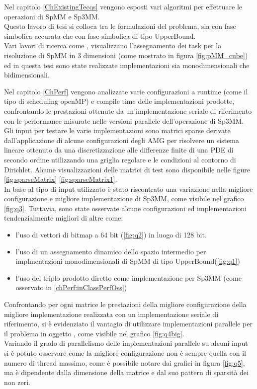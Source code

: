 Nel capitolo \ref{ChExistingTecqs} vengono esposti vari algoritmi per effettuare le operazioni di SpMM e Sp3MM.\\
Questo lavoro di tesi si colloca tra le formulazioni \rowbyrow del problema, 
sia con fase simbolica accurata che con fase simbolica di tipo UpperBound.\\
Vari lavori di ricerca come \cite{cartesianPartitioningModels}, visualizzano 
l'assegnamento dei task per la risoluzione di SpMM in 3 dimensioni (come mostrato in figura \ref{fig:pMM_cube})
ed in questa tesi sono state realizzate implementazioni sia monodimensionali che bidimensionali.

Nel capitolo \ref{ChPerf} vengono analizzate varie configurazioni a runtime (come il tipo di scheduling openMP) 
e compile time delle implementazioni prodotte,
confrontando le prestazioni ottenute da un'implementazione seriale di riferimento 
con le performance misurate nelle versioni parallele dell'operazione di Sp3MM.\\
Gli input per testare le varie implementazioni sono matrici sparse derivate dall'applicazione di 
alcune configurazioni degli AMG per risolvere un sistema lineare ottenuto da 
una discretizzazione alle differenze finite di una PDE di secondo ordine
utilizzando una griglia regolare e le condizioni al contorno di Dirichlet.
Alcune visualizzazioni delle matrici di test sono disponibile nelle figure \ref{fig:sparseMatrix} \ref{fig:sparseMatrix1}.\\
In base al tipo di input utilizzato è stato riscontrato una variazione nella migliore configurazione e migliore implementazione
di Sp3MM, come visibile nel grafico \ref{fig:q3}.
Tuttavia, sono state osservate alcune configurazioni ed implementazioni tendenzialmente migliori di altre come:
\begin{itemize}
	\item	l'uso di vettori di bitmap a 64 bit (\ref{fig:q2}) in luogo di 128 bit.
	\item	l'uso di un assegnamento dinamico dello spazio intermedio per implmentazioni monodimensionali di SpMM di tipo UpperBound(\ref{fig:q1})
	\item	l'uso del triplo prodotto diretto come implementazione per Sp3MM (come osservato in \ref{chPerf:inClassPerfOss})
\end{itemize}
Confrontando per ogni matrice le prestazioni della migliore configurazione della migliore implementazione realizzata
con un implementazione seriale di riferimento, si è evidenziato il vantagio di utilizzare implementazioni parallele per il problema in oggetto
, come visibile nel grafico \ref{fig:q4big}.\\
Variando il grado di parallelismo delle implementazioni parallele su alcuni input si è potuto
osservare come la migliore configurazione non è sempre quella con il numero di thread massimo, 
come è possibile notare dai grafici in figura \ref{fig:q5},
ma è dipendente dalla dimensione della matrice e dal suo pattern di sparsità dei non zeri.
